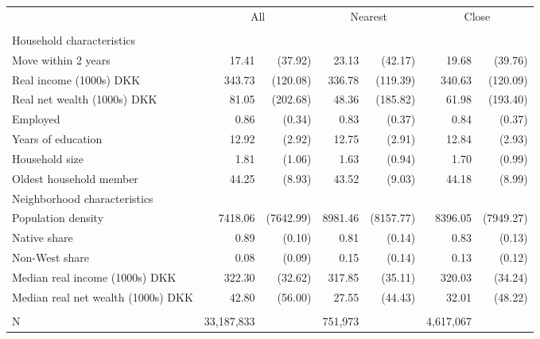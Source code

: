 \begin{tabular}{lrrrrrr}
\toprule
 & \multicolumn{2}{c}{All} & \multicolumn{2}{c}{Nearest} & \multicolumn{2}{c}{Close} \\ 
\cmidrule(lr){2-3} \cmidrule(lr){4-5} \cmidrule(lr){6-7}
 &  &  &  &  &  &  \\ 
\midrule
\multicolumn{7}{l}{Household characteristics} \\ 
\midrule
Move within 2 years & 17.41 & (37.92) & 23.13 & (42.17) & 19.68 & (39.76) \\ 
Real income (1000s) DKK & 343.73 & (120.08) & 336.78 & (119.39) & 340.63 & (120.09) \\ 
Real net wealth (1000s) DKK & 81.05 & (202.68) & 48.36 & (185.82) & 61.98 & (193.40) \\ 
Employed & 0.86 & (0.34) & 0.83 & (0.37) & 0.84 & (0.37) \\ 
Years of education & 12.92 & (2.92) & 12.75 & (2.91) & 12.84 & (2.93) \\ 
Household size & 1.81 & (1.06) & 1.63 & (0.94) & 1.70 & (0.99) \\ 
Oldest household member & 44.25 & (8.93) & 43.52 & (9.03) & 44.18 & (8.99) \\ 
\midrule
\multicolumn{7}{l}{Neighborhood characteristics} \\ 
\midrule
Population density & 7418.06 & (7642.99) & 8981.46 & (8157.77) & 8396.05 & (7949.27) \\ 
Native share & 0.89 & (0.10) & 0.81 & (0.14) & 0.83 & (0.13) \\ 
Non-West share & 0.08 & (0.09) & 0.15 & (0.14) & 0.13 & (0.12) \\ 
Median real income (1000s) DKK & 322.30 & (32.62) & 317.85 & (35.11) & 320.03 & (34.24) \\ 
Median real net wealth (1000s) DKK & 42.80 & (56.00) & 27.55 & (44.43) & 32.01 & (48.22) \\ 
\midrule
\multicolumn{7}{l}{\vspace*{-5mm}} \\ 
N & 33,187,833 &  & 751,973 &  & 4,617,067 &  \\ 
\bottomrule
\end{tabular}
